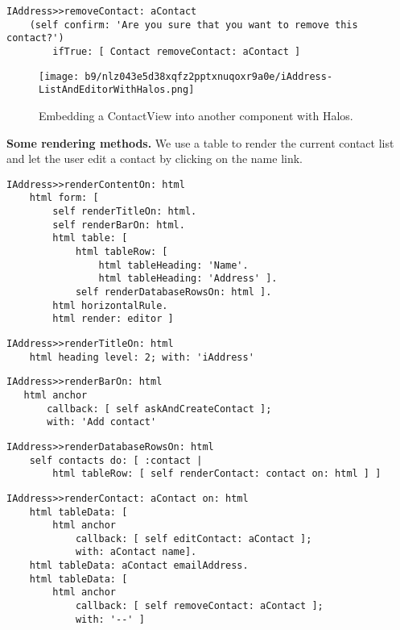 \documentclass[a4paper,10pt,twoside]{book}
\begin{document}
\begin{lstlisting}
IAddress>>removeContact: aContact
    (self confirm: 'Are you sure that you want to remove this contact?')
        ifTrue: [ Contact removeContact: aContact ]
\end{lstlisting}

\begin{figure}[h!tbp]
	\begin{center}
		\texttt{[image: b9/nlz043e5d38xqfz2pptxnuqoxr9a0e/iAddress-ListAndEditorWithHalos.png]}
		\caption{Embedding a ContactView into another component with Halos.\label{book:components:embedding:example:listeditorwithhalo}}
	\end{center}
\end{figure}


\textbf{Some rendering methods.} We use a table to render the current contact list and let the user edit a contact by clicking on the name link.

\begin{lstlisting}
IAddress>>renderContentOn: html
    html form: [
        self renderTitleOn: html.
        self renderBarOn: html.
        html table: [ 
            html tableRow: [
                html tableHeading: 'Name'.
                html tableHeading: 'Address' ].
            self renderDatabaseRowsOn: html ].
        html horizontalRule.
        html render: editor ]
\end{lstlisting}

\begin{lstlisting}
IAddress>>renderTitleOn: html
    html heading level: 2; with: 'iAddress'
\end{lstlisting}

\begin{lstlisting}
IAddress>>renderBarOn: html
   html anchor
       callback: [ self askAndCreateContact ]; 
       with: 'Add contact'
\end{lstlisting}

\begin{lstlisting}
IAddress>>renderDatabaseRowsOn: html
    self contacts do: [ :contact |
        html tableRow: [ self renderContact: contact on: html ] ]
\end{lstlisting}

\begin{lstlisting}
IAddress>>renderContact: aContact on: html
    html tableData: [
        html anchor
            callback: [ self editContact: aContact ];
            with: aContact name].
    html tableData: aContact emailAddress.
    html tableData: [
        html anchor
            callback: [ self removeContact: aContact ];
            with: '--' ]
\end{lstlisting}
\end{document}
